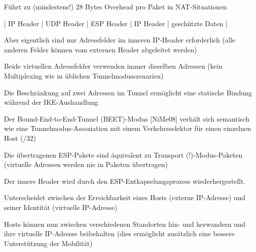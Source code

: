 \documentclass[a4paper]{article}
\begin{document}
\begin{multicols}{3}
\begin{itemize*}
\begin{itemize*}
\begin{itemize*}
                        \item Führt zu (mindestens!) 28 Bytes Overhead pro Paket in NAT-Situationen
                        \item | IP Header | UDP Header | ESP Header | IP Header | geschützte Daten |
                  \end{itemize*}
                  \item       Aber eigentlich sind nur Adressfelder im inneren IP-Header
                  erforderlich (alle anderen Felder können vom externen Header
                  abgeleitet werden)
                  \item       Beide virtuellen Adressfelder verwenden immer dieselben Adressen (kein
                  Multiplexing wie in üblichen Tunnelmodusszenarien)
                  \item       Die Beschränkung auf zwei Adressen im Tunnel ermöglicht eine statische
                  Bindung während der IKE-Aushandlung
                  \item       Der Bound-End-to-End-Tunnel (BEET)-Modus {[}NiMe08{]} verhält sich
                  semantisch wie eine Tunnelmodus-Assoziation mit einem Verkehrsselektor
                  für einen einzelnen Host (/32)
                  \item       Die übertragenen ESP-Pakete sind äquivalent zu Transport
                  (!)-Modus-Paketen (virtuelle Adressen werden nie in Paketen
                  übertragen)
                  \item       Der innere Header wird durch den ESP-Entkapselungsprozess
                  wiederhergestellt.
                  \item       Unterscheidet zwischen der Erreichbarkeit eines Hosts (externe
                  IP-Adresse) und seiner Identität (virtuelle IP-Adresse)
                  \item       Hosts können nun zwischen verschiedenen Standorten hin- und herwandern
                  und ihre virtuelle IP-Adresse beibehalten (dies ermöglicht zusätzlich
                  eine bessere Unterstützung der Mobilität)
            \end{itemize*}


\end{itemize*}
\end{multicols}
\end{document}
